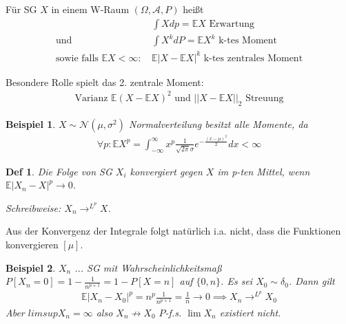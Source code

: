 \documentclass[]{article}
\newtheorem*{definition*}{Def}
\newtheorem*{example}{Beispiel}
\begin{document}
Für SG $X$ in einem W-Raum $(\Omega, \mathcal{A}, P)$ heißt
\begin{align*}
	&\int X dp = \mathbb{E} X \text{ Erwartung}\\
	\text{und } &\int X^k dP = \mathbb{E}X^k \text{ k-tes Moment}\\
	\text{sowie falls } \mathbb{E}X < \infty \text{: } &\mathbb{E}|X-\mathbb{E}X|^k \text{ k-tes zentrales Moment}
\end{align*}

Besondere Rolle spielt das 2. zentrale Moment: 
\begin{align*}
	\text{Varianz } \mathbb{E}(X-\mathbb{E}X)^2 \text{ und } ||X-\mathbb{E}X||_2 \text{ Streuung}
\end{align*}

\begin{example}
	$X\sim \mathcal{N}(\mu, \sigma^2)$ Normalverteilung besitzt alle Momente, da
	\begin{align*}
		\forall p: \mathbb{E}X^p = \int_{-\infty}^{\infty} x^p \frac{1}{\sqrt{2\pi}\sigma} e^{-\frac{(x-\mu)^2}{2}} dx < \infty
	\end{align*}
\end{example}

\begin{definition*}
	Die Folge von SG $X_i$ konvergiert gegen $X$ im p-ten Mittel, wenn $\mathbb{E}|X_n - X|^p \rightarrow 0$.
	
	Schreibweise: $X_n \rightarrow^{L^p} X$.
\end{definition*}

Aus der Konvergenz der Integrale folgt natürlich i.a. nicht, dass die Funktionen konvergieren $[\mu]$.

\begin{example}
	$X_n$ ... SG mit Wahrscheinlichkeitsmaß $P[X_n=0]=1-\frac{1}{n^{p+1}} = 1 - P[X=n]$ auf $\{0,n\}$. Es sei $X_0 \sim \delta_0$. Dann gilt
	\begin{align*}
		\mathbb{E}|X_n - X_0|^p = n^p \frac{1}{n^{p+1}} = \frac{1}{n} \rightarrow 0 \implies X_n \rightarrow^{L^p} X_0
	\end{align*}
	Aber $limsup X_n = \infty$ also $X_n \nrightarrow X_0$ $P$-f.s. $\lim X_n$ existiert nicht.
\end{example}
\end{document}
